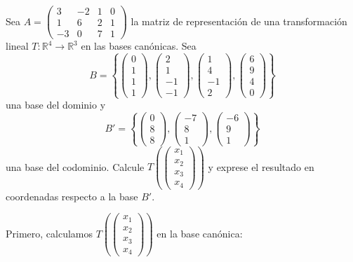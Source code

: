 \begin{prob}
Sea $A = \begin{pmatrix}
3 & -2 & 1 & 0 \\
1 & 6 & 2 & 1 \\
-3 & 0 & 7 & 1
\end{pmatrix}$ la matriz de representación de una transformación lineal $T: \mathbb{R}^4 \rightarrow \mathbb{R}^3$ en las bases canónicas. Sea
\[
B = \left\lbrace
\begin{pmatrix} 0 \\ 1 \\ 1 \\ 1 \end{pmatrix},
\begin{pmatrix} 2 \\ 1 \\ -1 \\ -1 \end{pmatrix},
\begin{pmatrix} 1 \\ 4 \\ -1 \\ 2 \end{pmatrix},
\begin{pmatrix} 6 \\ 9 \\ 4 \\ 0 \end{pmatrix}
\right\rbrace
\]
una base del dominio y
\[
B' = \left\lbrace
\begin{pmatrix} 0 \\ 8 \\ 8 \end{pmatrix},
\begin{pmatrix} -7 \\ 8 \\ 1 \end{pmatrix},
\begin{pmatrix} -6 \\ 9 \\ 1 \end{pmatrix}
\right\rbrace
\]
una base del codominio. Calcule $T\left(\begin{pmatrix} x_1 \\ x_2 \\ x_3 \\ x_4 \end{pmatrix}\right)$ y exprese el resultado en coordenadas respecto a la base $B'$.
\begin{myproof}
Primero, calculamos $T\left(\begin{pmatrix} x_1 \\ x_2 \\ x_3 \\ x_4 \end{pmatrix}\right)$ en la base canónica:

\end{myproof}
\end{prob}
